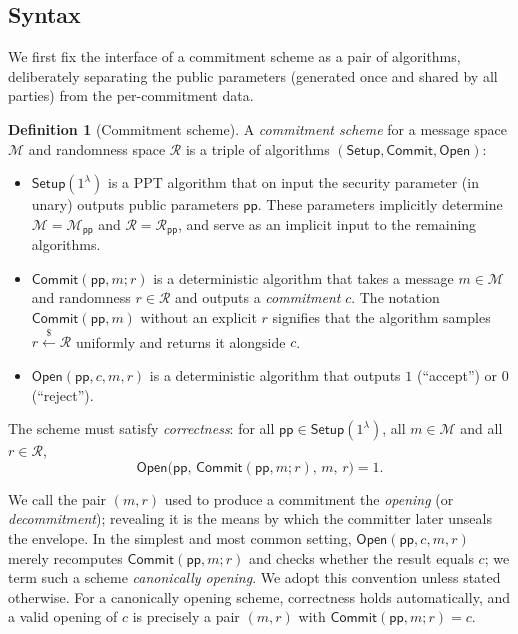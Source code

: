 \documentclass[11pt,a4paper]{article}
\theoremstyle{definition}
\newtheorem{definition}[theorem]{Definition}
\theoremstyle{remark}
\begin{document}
\subsection{Syntax}\label{commitments:subsec:syntax}

We first fix the interface of a commitment scheme as a pair of algorithms, deliberately separating the public parameters (generated once and shared by all parties) from the per-commitment data.

\begin{definition}[Commitment scheme]\label{commitments:def:scheme}
A \emph{commitment scheme} for a message space \(\mathcal{M}\) and randomness space \(\mathcal{R}\) is a triple of algorithms \((\mathsf{Setup}, \mathsf{Commit}, \mathsf{Open})\):
\begin{itemize}
  \item \(\mathsf{Setup}(1^\lambda)\) is a PPT algorithm that on input the security parameter (in unary) outputs public parameters \(\mathsf{pp}\). These parameters implicitly determine \(\mathcal{M} = \mathcal{M}_{\mathsf{pp}}\) and \(\mathcal{R} = \mathcal{R}_{\mathsf{pp}}\), and serve as an implicit input to the remaining algorithms.
  \item \(\mathsf{Commit}(\mathsf{pp}, m; r)\) is a deterministic algorithm that takes a message \(m \in \mathcal{M}\) and randomness \(r \in \mathcal{R}\) and outputs a \emph{commitment} \(c\). The notation \(\mathsf{Commit}(\mathsf{pp}, m)\) without an explicit \(r\) signifies that the algorithm samples \(r \xleftarrow{\$} \mathcal{R}\) uniformly and returns it alongside \(c\).
  \item \(\mathsf{Open}(\mathsf{pp}, c, m, r)\) is a deterministic algorithm that outputs \(1\) (``accept'') or \(0\) (``reject'').
\end{itemize}
The scheme must satisfy \emph{correctness}: for all \(\mathsf{pp} \in \mathsf{Setup}(1^\lambda)\), all \(m \in \mathcal{M}\) and all \(r \in \mathcal{R}\),
\[
  \mathsf{Open}\bigl(\mathsf{pp},\, \mathsf{Commit}(\mathsf{pp}, m; r),\, m,\, r\bigr) = 1.
\]
\end{definition}

We call the pair \((m, r)\) used to produce a commitment the \emph{opening} (or \emph{decommitment}); revealing it is the means by which the committer later unseals the envelope. In the simplest and most common setting, \(\mathsf{Open}(\mathsf{pp}, c, m, r)\) merely recomputes \(\mathsf{Commit}(\mathsf{pp}, m; r)\) and checks whether the result equals \(c\); we term such a scheme \emph{canonically opening}. We adopt this convention unless stated otherwise. For a canonically opening scheme, correctness holds automatically, and a valid opening of \(c\) is precisely a pair \((m, r)\) with \(\mathsf{Commit}(\mathsf{pp}, m; r) = c\).
\end{document}
